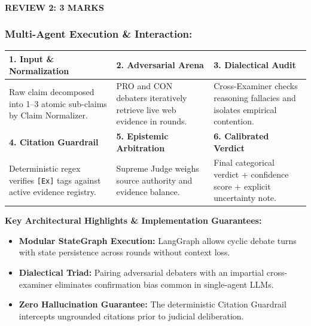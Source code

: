 \documentclass[aspectratio=169, 10pt]{beamer}
\begin{document}
\begin{frame}
    \framesubtitle{REVIEW 2: 3 MARKS}
    \frametitle{Multi-Agent Execution \& Interaction:}
    \vspace{-0.1cm}
    
    \renewcommand{\arraystretch}{1.15}
    \scriptsize
    \noindent
    \begin{tabularx}{\textwidth}{X X X}
        \toprule
        \rowcolor{HeaderBg}
        \textbf{1. Input \& Normalization} & \textbf{2. Adversarial Arena} & \textbf{3. Dialectical Audit} \\
        \midrule
        Raw claim decomposed into 1--3 atomic sub-claims by Claim Normalizer. & PRO and CON debaters iteratively retrieve live web evidence in rounds. & Cross-Examiner checks reasoning fallacies and isolates empirical contention. \\
        \midrule
        \rowcolor{HeaderBg}
        \textbf{4. Citation Guardrail} & \textbf{5. Epistemic Arbitration} & \textbf{6. Calibrated Verdict} \\
        \midrule
        Deterministic regex verifies \texttt{[Ex]} tags against active evidence registry. & Supreme Judge weighs source authority and evidence balance. & Final categorical verdict + confidence score + explicit uncertainty note. \\
        \bottomrule
    \end{tabularx}
    
    \vspace{0.25cm}
    {\small\textbf{\color{NavyDark}Key Architectural Highlights \& Implementation Guarantees:}}
    \vspace{0.08cm}
    \begin{itemize}\setlength\itemsep{0.10cm}
        \item \textbf{Modular StateGraph Execution:} LangGraph allows cyclic debate turns with state persistence across rounds without context loss.
        \item \textbf{Dialectical Triad:} Pairing adversarial debaters with an impartial cross-examiner eliminates confirmation bias common in single-agent LLMs.
        \item \textbf{Zero Hallucination Guarantee:} The deterministic Citation Guardrail intercepts ungrounded citations prior to judicial deliberation.
    \end{itemize}
\end{frame}
\end{document}
